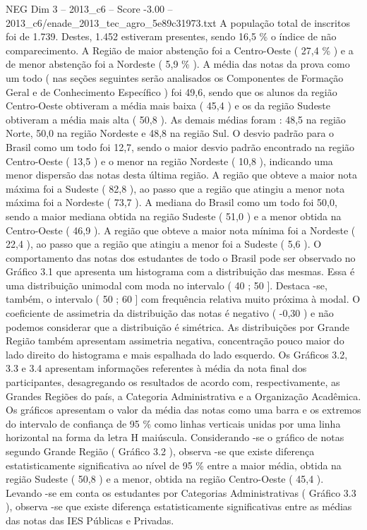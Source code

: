 \begin{textsample}{NEG Dim 3 – 2013\_c6 – Score -3.00 – 2013\_c6/enade\_2013\_tec\_agro\_5e89c31973.txt}
A população total de inscritos foi de 1.739.
Destes, 1.452 estiveram presentes, sendo 16,5 \% o índice de não comparecimento.
A Região de maior abstenção foi a Centro-Oeste ( 27,4 \% ) e a de menor abstenção foi a Nordeste ( 5,9 \% ).
A média das notas da prova como um todo ( nas seções seguintes serão analisados os Componentes de Formação Geral e de Conhecimento Específico ) foi 49,6, sendo que os alunos da região Centro-Oeste obtiveram a média mais baixa ( 45,4 ) e os da região Sudeste obtiveram a média mais alta ( 50,8 ).
As demais médias foram : 48,5 na região Norte, 50,0 na região Nordeste e 48,8 na região Sul.
O desvio padrão para o Brasil como um todo foi 12,7, sendo o maior desvio padrão encontrado na região Centro-Oeste ( 13,5 ) e o menor na região Nordeste ( 10,8 ), indicando uma menor dispersão das notas desta última região.
A região que obteve a maior nota máxima foi a Sudeste ( 82,8 ), ao passo que a região que atingiu a menor nota máxima foi a Nordeste ( 73,7 ).
A mediana do Brasil como um todo foi 50,0, sendo a maior mediana obtida na região Sudeste ( 51,0 ) e a menor obtida na Centro-Oeste ( 46,9 ).
A região que obteve a maior nota mínima foi a Nordeste ( 22,4 ), ao passo que a região que atingiu a menor foi a Sudeste ( 5,6 ).
O comportamento das notas dos estudantes de todo o Brasil pode ser observado no Gráfico 3.1 que apresenta um histograma com a distribuição das mesmas.
Essa é uma distribuição unimodal com moda no intervalo ( 40 ; 50 ].
Destaca -se, também, o intervalo ( 50 ; 60 ] com frequência relativa muito próxima à modal.
O coeficiente de assimetria da distribuição das notas é negativo ( -0,30 ) e não podemos considerar que a distribuição é simétrica.
As distribuições por Grande Região também apresentam assimetria negativa, concentração pouco maior do lado direito do histograma e mais espalhada do lado esquerdo.
Os Gráficos 3.2, 3.3 e 3.4 apresentam informações referentes à média da nota final dos participantes, desagregando os resultados de acordo com, respectivamente, as Grandes Regiões do país, a Categoria Administrativa e a Organização Acadêmica.
Os gráficos apresentam o valor da média das notas como uma barra e os extremos do intervalo de confiança de 95 \% como linhas verticais unidas por uma linha horizontal na forma da letra H maiúscula.
Considerando -se o gráfico de notas segundo Grande Região ( Gráfico 3.2 ), observa -se que existe diferença estatisticamente significativa ao nível de 95 \% entre a maior média, obtida na região Sudeste ( 50,8 ) e a menor, obtida na região Centro-Oeste ( 45,4 ).
Levando -se em conta os estudantes por Categorias Administrativas ( Gráfico 3.3 ), observa -se que existe diferença estatisticamente significativas entre as médias das notas das IES Públicas e Privadas.

\end{textsample}
